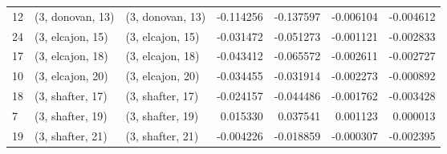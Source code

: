\begin{tabular}{lllrrrr}
12 &  (3, donovan, 13) &  (3, donovan, 13) & -0.114256 & -0.137597 &  -0.006104 & -0.004612 \\
24 &  (3, elcajon, 15) &  (3, elcajon, 15) & -0.031472 & -0.051273 &  -0.001121 & -0.002833 \\
17 &  (3, elcajon, 18) &  (3, elcajon, 18) & -0.043412 & -0.065572 &  -0.002611 & -0.002727 \\
10 &  (3, elcajon, 20) &  (3, elcajon, 20) & -0.034455 & -0.031914 &  -0.002273 & -0.000892 \\
18 &  (3, shafter, 17) &  (3, shafter, 17) & -0.024157 & -0.044486 &  -0.001762 & -0.003428 \\
7  &  (3, shafter, 19) &  (3, shafter, 19) &  0.015330 &  0.037541 &   0.001123 &  0.000013 \\
19 &  (3, shafter, 21) &  (3, shafter, 21) & -0.004226 & -0.018859 &  -0.000307 & -0.002395 \\
\bottomrule
\end{tabular}
